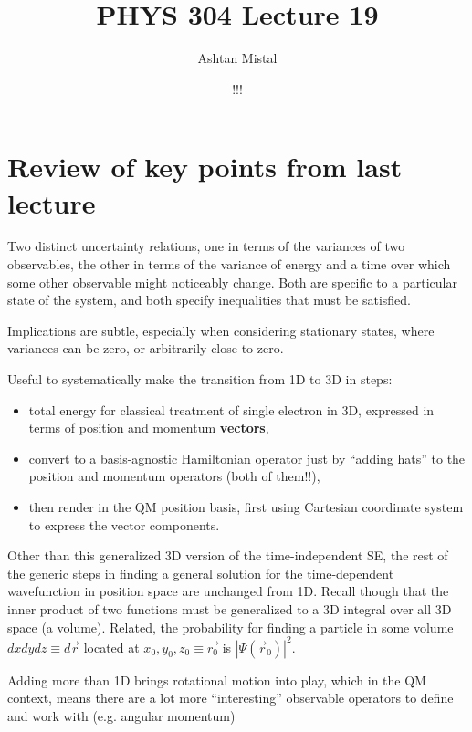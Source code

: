 \documentclass{article}
\title{PHYS 304 Lecture 19}
\author{Ashtan Mistal}
\date{!!!}
\begin{document}
\ifstandalone
\maketitle
\fi

\graphicspath{{./Lecture19/}}

\section{Review of key points from last lecture}

Two distinct uncertainty relations, one in terms of the variances of two observables, the other in terms of the variance of energy and a time over which some other observable might noticeably change.  Both are specific to a particular state of the system, and both specify inequalities that must be satisfied.

Implications are subtle, especially when considering stationary states, where variances can be zero, or arbitrarily close to zero.

Useful to systematically make the transition from 1D to 3D in steps: 

\begin{itemize}
    \item total energy for classical treatment of single electron in 3D, expressed in terms of position and momentum \textbf{vectors},
    \item convert to a basis-agnostic Hamiltonian operator just by “adding hats” to the position and momentum operators (both of them!!), 
    \item then render in the QM position basis, first using Cartesian coordinate system to express the vector components. 
\end{itemize} 

Other than this generalized 3D version of the time-independent SE, the rest of the generic steps in finding a general solution for the time-dependent wavefunction in position space are unchanged from 1D. Recall though that the inner product of two functions must be generalized to a 3D integral over all 3D space (a volume).  Related, the probability for finding a particle in some volume $dx dy dz \equiv d \vec{r}$ located at $x_0, y_0, z_0 \equiv \vec{r_0}$ is $|\Psi(\vec{r}_0)|^2$. 

Adding more than 1D brings rotational motion into play, which in the QM context, means there are a lot more “interesting” observable operators to define and work with (e.g. angular momentum)
\end{document}
